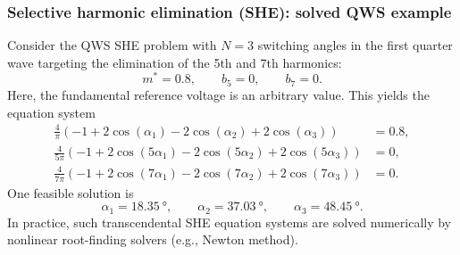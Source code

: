 \begin{frame}
    \frametitle{Selective harmonic elimination (SHE): solved QWS example}
    Consider the QWS SHE problem with \(N=3\) switching angles in the first quarter wave targeting the elimination of the 5th and 7th harmonics:
    \begin{equation}
        m^*=0.8,
        \qquad
        b_5=0,
        \qquad
        b_7=0.
    \end{equation} \pause
    Here, the fundamental reference voltage is an arbitrary value. This yields the equation system
    \begin{equation}
        \begin{aligned}
            \frac{4}{\pi}\left(-1+2\cos(\alpha_1)-2\cos(\alpha_2)+2\cos(\alpha_3)\right)     & = 0.8, \\
            \frac{4}{5\pi}\left(-1+2\cos(5\alpha_1)-2\cos(5\alpha_2)+2\cos(5\alpha_3)\right) & = 0,   \\
            \frac{4}{7\pi}\left(-1+2\cos(7\alpha_1)-2\cos(7\alpha_2)+2\cos(7\alpha_3)\right) & = 0.
        \end{aligned}
    \end{equation}\pause
    One feasible solution is
    \begin{equation}
        \alpha_1=\SI{18.35}{\degree},
        \qquad
        \alpha_2=\SI{37.03}{\degree},
        \qquad
        \alpha_3=\SI{48.45}{\degree}.
    \end{equation}\pause
    In practice, such transcendental SHE equation systems are solved numerically by nonlinear root-finding solvers (e.g., Newton method).
\end{frame}

